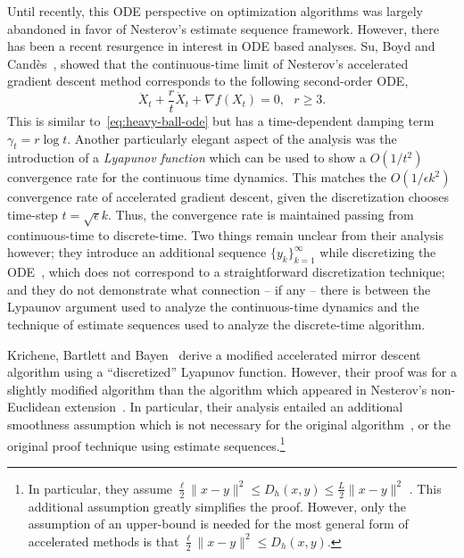 \documentclass[11pt]{article}
\theoremstyle{plain}
\begin{document}
Until recently, this ODE perspective on optimization algorithms was largely abandoned in favor of Nesterov's estimate sequence framework.  However, there has been a recent resurgence in interest in ODE based analyses.  Su, Boyd and Cand\`es~\cite{SuBoydCandes14}, showed that the continuous-time limit of Nesterov's accelerated gradient descent method corresponds to the following second-order ODE, 
 \begin{equation}\label{Eq:SuBoydCandes}
 \ddot X_t + \frac{r}{t} \dot X_t + \nabla f(X_t) = 0,\,\,\,\,r \geq 3.
 \end{equation}
This is similar to~\eqref{eq:heavy-ball-ode} but has a time-dependent damping term $\gamma_t = r\log t$.  Another particularly elegant aspect of the analysis was the introduction of a {\em Lyapunov function} which can be used to show a $O(1/t^2)$ convergence rate for the continuous time dynamics. This matches the $O(1/\epsilon k^2)$ convergence rate of accelerated gradient descent, given the discretization chooses time-step $t= \sqrt\epsilon k$. Thus, the convergence rate is maintained passing from continuous-time to discrete-time. Two things remain unclear from their analysis however;  they introduce an additional sequence $\{y_k\}_{k=1}^\infty$ while discretizing the ODE~\cite[Sec 2]{Acceleration},  which does not correspond to a straightforward discretization technique; and they do not demonstrate what connection -- if any --   there is between the Lypaunov argument used to analyze the continuous-time dynamics and the technique of estimate sequences used to analyze the discrete-time algorithm. 

Krichene, Bartlett and Bayen~\cite{Krichene15} derive a modified accelerated mirror descent algorithm using a ``discretized'' Lyapunov function. However, their proof was for a slightly modified algorithm than the algorithm which appeared in Nesterov's non-Euclidean extension~\cite{Nesterov05}. In particular, their analysis entailed an additional smoothness assumption which is not necessary for the original algorithm~\cite{Nesterov05}, or the original proof technique using estimate sequences.\footnote{In particular, they assume $\frac{\ell }{2} \|x-y\|^2 \leq  D_h(x,y) \leq \frac{L}{2}\|x-y\|^2$%
. This additional assumption greatly simplifies the proof. However, only the assumption of an upper-bound is needed for the most general form of accelerated methods is that $\frac{\ell }{2} \|x-y\|^2 \leq  D_h(x,y)$.} 
\end{document}

